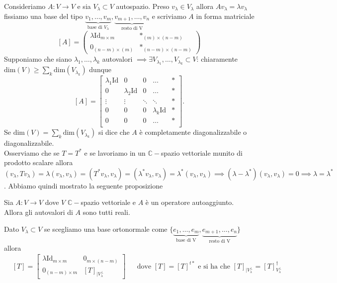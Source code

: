 \documentclass[12pt, twoside, italian, openany]{book}
\begin{document}
	Consideriamo $A: V \to V$ e sia $V_\lambda \subset V$ autospazio. Preso $v_\lambda \in V_\lambda$ allora  $Av_\lambda = \lambda v_\lambda$ fissiamo una base del tipo ${\underbrace{v_1, \ldots, v_m}_\text{base di $V_\lambda$}, \underbrace{v_{m+1}, \ldots, v_n}_\text{resto di V}}$ e scriviamo $A$ in forma matriciale
	$$
		[A] = \begin{pmatrix}
			\lambda \text{Id}_{m \times m} & \ast_{(m) \times (n-m)}\\
			0_{(n-m) \times (m)} & \ast_{(n-m) \times (n-m)}
		\end{pmatrix}
	$$
	Supponiamo che siano $\lambda_1, \ldots, \lambda_k$ autovalori $\implies \exists V_{\lambda_1}, \ldots, V_{\lambda_k} \subset V$: chiaramente $\text{dim}(V) \geq \sum\limits_k \text{dim}(V_{\lambda_k})$ dunque
	$$
	[A] = \begin{bmatrix}
		\lambda_1 \text{Id} & 0 & 0 & \ldots & \ast \\
		0 & \lambda_2 \text{Id} & 0 & \ldots & \ast \\
		\vdots & 	\vdots		&		\ddots & \ddots & \ast \\
		0 & 0 &		0 & \lambda_k \text{Id} & \ast \\
		0 & 0 & 	0 	& \ldots & \ast\\
	\end{bmatrix}.
	$$
	Se $\text{dim}(V) = \sum\limits_k \text{dim}(V_{\lambda_k})$ si dice che $A$ è completamente diagonalizzabile o diagonalizzabile. \\
	Osserviamo che se $T = T^*$ e se lavoriamo in un $\mathbb{C}-$spazio vettoriale munito di prodotto scalare allora $(v_\lambda, Tv_\lambda) = \lambda (v_\lambda, v_\lambda) = (T^* v_\lambda, v_\lambda) = (\lambda^* v_\lambda, v_\lambda) = \lambda^* (v_\lambda, v_\lambda) \implies (\lambda - \lambda^*) (v_\lambda, v_\lambda) = 0 \implies \lambda = \lambda^*$.
	Abbiamo quindi mostrato la seguente proposizione
	\begin{prop}
	Sia $A: V \to V$ dove $V$ $\mathbb{C}-$spazio vettoriale e $A$ è un operatore autoaggiunto. Allora gli autovalori di $A$ sono tutti reali.
	\end{prop}
	Dato $V_\lambda \subset V$ se scegliamo una base ortonormale come $\{ \underbrace{e_1, \ldots, e_m}_\text{base di V}, \underbrace{e_{m+1}, \ldots, e_n}_\text{resto di V} \}$ allora
	\begin{align*}
	&[T] = \begin{bmatrix}
		\lambda \text{Id}_{m \times m} & 0_{m \times (n - m)} \\
		0_{(n-m) \times m} & [T]_{|V_\lambda^\perp}
	\end{bmatrix} & &\text{dove } [T] = [T]^{t \ast} \text{ e si ha che } [T]_{|V_\lambda^\perp} = [T]_{V_\lambda^\perp}^{\dag}
	\end{align*}
\end{document}
